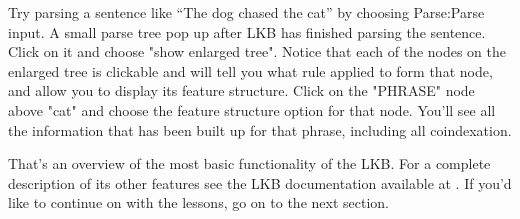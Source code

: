 Try parsing a sentence like ``The dog chased the cat'' by choosing Parse:Parse input.  A small parse tree pop up after LKB has finished parsing the sentence.  Click on it and choose "show enlarged tree".  Notice that each of the nodes on the enlarged tree is clickable and will tell you what rule applied to form that node, and allow you to display its feature structure.  Click on the "PHRASE" node above "cat" and choose the feature structure option for that node.  You'll see all the information that has been built up for that phrase, including all coindexation. 

That's an overview of the most basic functionality of the LKB.  For a complete description of its other features see the LKB documentation available at  .  If you'd like to continue on with the lessons, go on to the next section.


